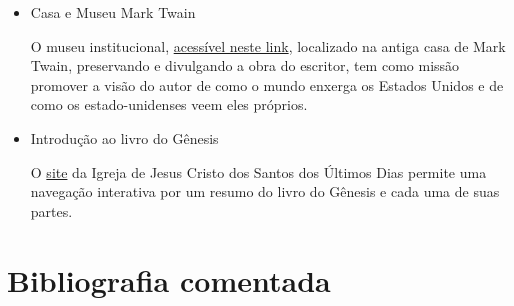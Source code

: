 \documentclass[12pt]{extarticle}
\begin{document}
\begin{itemize}
\item Casa e Museu Mark Twain

O museu institucional, \href{https://marktwainhouse.org/}{acessível neste link},
 localizado na antiga casa de Mark Twain, preservando e 
divulgando a obra do escritor, tem como missão promover a visão do autor de como 
o mundo enxerga os Estados Unidos e de como os estado-unidenses veem eles próprios. 

\item Introdução ao livro do Gênesis

O \href{https://www.churchofjesuschrist.org/study/manual/old-testament-seminary-teacher-manual/introduction-to-the-book-of-genesis?lang=por}{site} da Igreja de Jesus Cristo dos 
Santos dos Últimos Dias permite uma navegação interativa 
por um resumo do livro do Gênesis e cada uma de suas partes.
\end{itemize}

\section{Bibliografia comentada}
\end{document}
